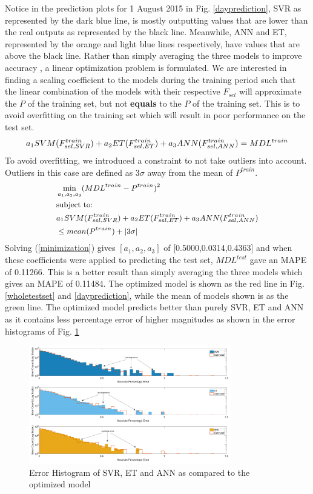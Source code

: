 \documentclass[conference]{IEEEtran}
\begin{document}
  Notice in the prediction plots for 1 August 2015 in Fig. \ref{dayprediction}, SVR as represented by the dark blue line, is mostly outputting values that are lower than the real outputs as represented by the black line. Meanwhile, ANN and ET, represented by the orange and light blue lines respectively, have values that are above the black line. Rather than simply averaging the three models to improve accuracy \cite{lan2009}, a linear optimization problem is formulated.
We are interested in finding a scaling coefficient to the models during the training period such that the linear combination of the models with their respective $F_{sel}$ will approximate the $P$ of the training set, but not \textbf{equals} to the $P$ of the training set. This is to avoid overfitting on the training set which will result in poor performance on the test set.  
\begin{equation}
\footnotesize
	a_1SVM(F_{sel,SVR}^{train})+a_2ET(F_{sel,ET}^{train})+a_3ANN(F_{sel,ANN}^{train}) = MDL^{train}
\end{equation}
To avoid overfitting, we introduced a constraint to not take outliers into account. Outliers in this case are defined as 3$\sigma$ away from the mean of $P^{train}$.
\begin{equation} \label{minimization}
\footnotesize
\begin{aligned}
&\min_{a_1,a_2,a_3} (MDL^{train}-P^{train})^2\\
& \text{subject to:}\\
&a_1SVM(F_{sel,SVR}^{train})+a_2ET(F_{sel,ET}^{train})+a_3ANN(F_{sel,ANN}^{train})\\ 
&\leq mean(P^{train})+|3\sigma|
\end{aligned}
\end{equation}
Solving (\ref{minimization}) gives $[a_1, a_2, a_3]$ of [0.5000,0.0314,0.4363] and when these coefficients were applied to predicting the test set, $MDL^{test}$ gave an MAPE of 0.11266. This is a better result than simply averaging the three models\cite{lan2009} which gives an MAPE of 0.11484. The optimized model is shown as the red line in Fig. \ref{wholetestset} and \ref{dayprediction}, while the mean of models shown is as the green line. The optimized model predicts better than purely SVR, ET and ANN as it contains less percentage error of higher magnitudes as shown in the error histograms of Fig. \ref{errorhist}
 \begin{figure}[htb!]\centering \footnotesize
 	\includegraphics[width=88mm]{apecomparison}
 	\caption{Error Histogram of SVR, ET and ANN as compared to the optimized model}
 	\vspace{-0.3cm}
 	\label{errorhist}
 \end{figure}
\end{document}
